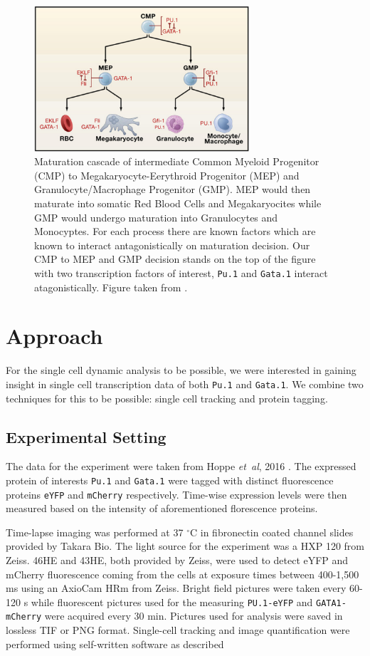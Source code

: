 \documentclass{bioinfo}
\begin{document}
\begin{figure}[h]
\includegraphics[width=8cm]{figures/homatopoietic_focus}
\caption{Maturation cascade of intermediate Common Myeloid Progenitor (CMP) to Megakaryocyte-Eerythroid Progenitor (MEP) and Granulocyte/Macrophage Progenitor (GMP). MEP would then maturate into somatic Red Blood Cells and Megakaryocites while GMP would undergo maturation into Granulocytes and Monocyptes. For each process there are known factors which are known to interact antagonistically on maturation decision. Our CMP to MEP and GMP decision stands on the top of the figure with two transcription factors of interest, \texttt{Pu.1} and \texttt{Gata.1} interact atagonistically. Figure taken from \citealp{Graf09}.}\label{fig:01}
\end{figure}

\section{Approach}

For the single cell dynamic analysis to be possible, we were interested in gaining insight in single cell transcription data of both \texttt{Pu.1} and \texttt{Gata.1}. We combine two techniques for this to be possible: single cell tracking and protein tagging.

\subsection{Experimental Setting}

The data for the experiment were taken from Hoppe {\it et~al}, 2016 \citep{Hoppe16}. The expressed protein of interests \texttt{Pu.1} and \texttt{Gata.1} were tagged with distinct fluorescence proteins \texttt{eYFP} and \texttt{mCherry} respectively. Time-wise expression levels were then measured based on the intensity of aforementioned florescence proteins.

Time-lapse imaging was performed at 37 $^{\circ}$C in fibronectin coated channel slides provided by Takara Bio. The light source for the experiment was a HXP 120 from Zeiss. 46HE and 43HE, both provided by Zeiss, were used to detect eYFP and mCherry fluorescence coming from the cells at exposure times between 400-1,500 ms using an AxioCam HRm from Zeiss. Bright field pictures were taken every 60-120 s while fluorescent pictures used for the measuring \texttt{PU.1-eYFP} and \texttt{GATA1-mCherry} were acquired every 30 min. Pictures used for analysis were saved in lossless TIF or PNG format. Single-cell tracking and image quantification were performed using self-written software as described
\end{document}
